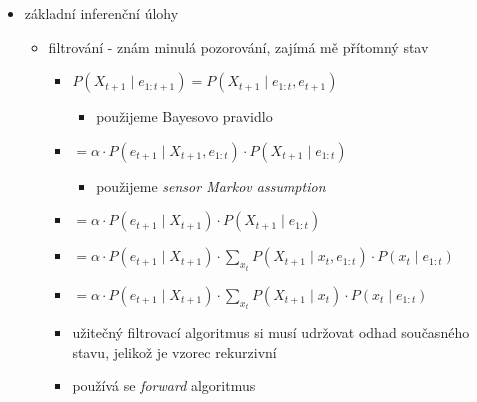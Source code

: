 \begin{itemize}
\begin{itemize}
\begin{itemize}
\begin{itemize}
\item zjednodušující předpoklady
\begin{itemize}
\item další stav závisí jen na předchozím stavu \dots{} \textit{Markov assumption}
\item všechny přechodové tabulky $P(X_t\mid X_{t-1})$ jsou identické přes všechna $t$ \dots{} \textit{stationary process}
\end{itemize}
\end{itemize}
\item sensor (observation) model
\begin{itemize}
\item popisuje, jak pozorované proměnné závisí na ostatních proměnných \dots{} $P(e_t\mid X_{0:t},e_{1:t-1})$
\item zjednodušující předpoklad: pozorování záleží jen na aktuálním stavu \dots{} \textit{sensor Markov assumption}
\end{itemize}
\end{itemize}
\item základní inferenční úlohy
\begin{itemize}
\item filtrování - znám minulá pozorování, zajímá mě přítomný stav
\begin{itemize}
\item $P(X_{t+1}\mid e_{1:t+1})=P(X_{t+1}\mid e_{1:t},e_{t+1})$
\begin{itemize}
\item použijeme Bayesovo pravidlo
\end{itemize}
\item $=\alpha\cdot P(e_{t+1}\mid X_{t+1},e_{1:t})\cdot P(X_{t+1}\mid e_{1:t})$
\begin{itemize}
\item použijeme \textit{sensor Markov assumption}
\end{itemize}
\item $=\alpha\cdot P(e_{t+1}\mid X_{t+1})\cdot P(X_{t+1}\mid e_{1:t})$
\item $=\alpha\cdot P(e_{t+1}\mid X_{t+1})\cdot \sum_{x_t}P(X_{t+1}\mid x_t,e_{1:t})\cdot P(x_t\mid e_{1:t})$
\item $=\alpha\cdot P(e_{t+1}\mid X_{t+1})\cdot \sum_{x_t}P(X_{t+1}\mid x_t)\cdot P(x_t\mid e_{1:t})$
\item užitečný filtrovací algoritmus si musí udržovat odhad současného stavu, jelikož je vzorec rekurzivní
\item používá se \textit{forward} algoritmus

\end{itemize}
\end{itemize}
\end{itemize}
\end{itemize}
